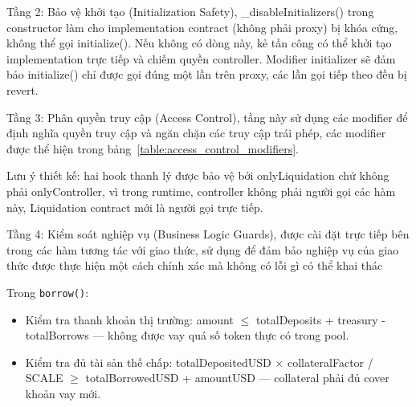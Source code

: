 \documentclass[../DoAn.tex]{subfiles}
\begin{document}
Tầng 2: Bảo vệ khởi tạo (Initialization Safety), \_disableInitializers() trong constructor làm cho implementation contract (không phải proxy) bị khóa cứng, không thể gọi initialize(). Nếu không có dòng này, kẻ tấn công có thể khởi tạo implementation trực tiếp và chiếm quyền controller. Modifier initializer sẽ đảm bảo initialize() chỉ được gọi đúng một lần trên proxy, các lần gọi tiếp theo đều bị revert.

Tầng 3: Phân quyền truy cập (Access Control), tầng này sử dụng các modifier để định nghĩa quyền truy cập và ngăn chặn các truy cập trái phép, các modifier được thể hiện trong bảng~\ref{table:access_control_modifiers}.

\begin{table}[H]
\centering
{}
\caption{Các modifier phân quyền truy cập}
\label{table:access_control_modifiers}
\end{table}


Lưu ý thiết kế: hai hook thanh lý được bảo vệ bởi onlyLiquidation chứ không phải onlyController, vì trong runtime, controller không phải người gọi các hàm này, Liquidation contract mới là người gọi trực tiếp.

Tầng 4: Kiểm soát nghiệp vụ (Business Logic Guards), được cài đặt trực tiếp bên trong các hàm tương tác với giao thức, sử dụng để đảm bảo nghiệp vụ của giao thức được thực hiện một cách chính xác mà không có lỗi gì có thể khai thác

Trong \texttt{borrow()}:
\begin{itemize}
  \item Kiểm tra thanh khoản thị trường: amount $\leq$ totalDeposits + treasury - totalBorrows --- không được vay quá số token thực có trong pool.
  \item Kiểm tra đủ tài sản thế chấp: totalDepositedUSD $\times$ collateralFactor / SCALE $\geq$ totalBorrowedUSD + amountUSD --- collateral phải đủ cover khoản vay mới.
\end{itemize}
\end{document}
